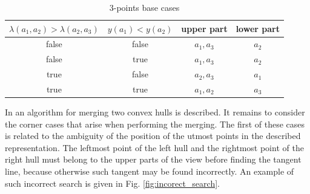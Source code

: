 \documentclass[a4paper,english,numberwithinsect,notab]{eurocg20-submission}
\begin{document}
	\begin{table}[htbp]
	\caption{3-points base cases}
	\label{table:3points}
	\begin{center}
		\begin{tabular}{|c|c|c|c|}
			\hline
			\textbf{$\lambda(a_1, a_2) > \lambda(a_2, a_3)$} & \textbf{$y(a_1) < y(a_2)$} & upper part & lower part\\
			\hline
			false & false & $a_1, a_3$ & $a_2$ \\
			\hline
			false & true & $a_1, a_3$ & $a_2$ \\
			\hline
			true & false & $a_2, a_3$ & $a_1$ \\
			\hline
			true & true & $a_1, a_2$ & $a_3$ \\
			\hline
		\end{tabular} 
	\end{center}
	\end{table} 



	
	
	
	In \cite{overmars} an algorithm for merging two convex hulls is described. It remains to consider the corner cases that arise when performing the merging. The first of these cases is related to the ambiguity of the position of the utmost points in the described representation. The leftmost point of the left hull and the rightmost point of the right hull must belong to the upper parts of the view before finding the tangent line, because otherwise such tangent may be found incorrectly. An example of such incorrect search is given in Fig. \ref{fig:incorect_search}.
	
\end{document}
